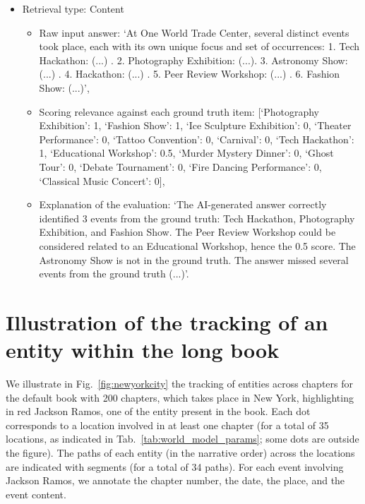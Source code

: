 \documentclass{article}
\begin{document}
\begin{itemize}
\begin{itemize}
        \item Explanation of the evaluation: `The AI-generated answer correctly identified Julian Ross and Sofia Ramos, earning a score of 1 for each. For Isaiah Bennett, only the first name `Isaiah' was mentioned without a last name, so it receives a score of 0.5. The AI answer also included Samuel Parker, who is not in the ground truth list. Overall, the AI answer captured most of the correct entities but added an extra person and missed the full name for Isaiah Bennett'.
    \end{itemize}
    \item Retrieval type: Content
    \begin{itemize}
        \item Raw input answer: `At One World Trade Center, several distinct events took place, each with its own unique focus and set of occurrences: 1. Tech Hackathon: (...) . 2. Photography Exhibition: (...). 3. Astronomy Show: (...) . 4. Hackathon: (...) . 5. Peer Review Workshop: (...) . 6. Fashion Show: (...)',
        \item Scoring relevance against each ground truth item: [{`Photography Exhibition': 1}, {`Fashion Show': 1}, {`Ice Sculpture Exhibition': 0}, {`Theater Performance': 0}, {`Tattoo Convention': 0}, {`Carnival': 0}, {`Tech Hackathon': 1}, {`Educational Workshop': 0.5}, {`Murder Mystery Dinner': 0}, {`Ghost Tour': 0}, {`Debate Tournament': 0}, {`Fire Dancing Performance': 0}, {`Classical Music Concert': 0}],
        \item Explanation of the evaluation: `The AI-generated answer correctly identified 3 events from the ground truth: Tech Hackathon, Photography Exhibition, and Fashion Show. The Peer Review Workshop could be considered related to an Educational Workshop, hence the 0.5 score. The Astronomy Show is not in the ground truth. The answer missed several events from the ground truth (...)'.
    \end{itemize}
\end{itemize}


\section{Illustration of the tracking of an entity within the long book}\label{app:newyork}

We illustrate in Fig.~\ref{fig:newyorkcity} the tracking of entities across chapters for the default book with 200 chapters, which takes place in New York, highlighting in red Jackson Ramos, one of the entity present in the book.
Each dot corresponds to a location involved in at least one chapter (for a total of 35 locations, as indicated in Tab.~\ref{tab:world_model_params}; some dots are outside the figure). The paths of each entity (in the narrative order) across the locations are indicated with segments (for a total of 34 paths).
For each event involving Jackson Ramos, we annotate the chapter number, the date, the place, and the event content.
\end{document}
